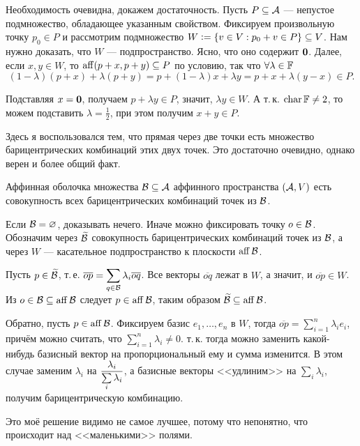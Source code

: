 \begin{solution}
    Необходимость очевидна, докажем достаточность. Пусть $P \subseteq \mathcal{A}$ --- непустое подмножество, обладающее указанным свойством. Фиксируем произвольную точку $p_0 \in P$ и рассмотрим подмножество $W \vcentcolon = \{v \in V : p_0 + v \in P\} \subseteq V$. Нам нужно доказать, что $W$ --- подпространство. Ясно, что оно содержит $\boldsymbol{0}$. Далее, если $x, y \in W$, то $\operatorname{aff}(p + x, p + y) \subseteq P$ по условию, так что $\forall \lambda \in \mathbb{F}$
    \[
        (1 - \lambda)(p + x) + \lambda(p + y) = p + (1 - \lambda)x + \lambda y = p + x + \lambda(y - x) \in P.
    \]

    Подставляя $x = \boldsymbol{0}$, получаем $p + \lambda y \in P$, значит, $\lambda y \in W$. А т.\,к. $\operatorname{char}\mathbb{F} \ne 2$, то можем подставить $\lambda = \frac{1}{2}$, при этом получим $x + y \in P$.
\end{solution}

Здесь я воспользовался тем, что прямая через две точки есть множество барицентрических комбинаций этих двух точек. Это достаточно очевидно, однако верен и более общий факт.

\begin{problem}[Из Винберга]
    Аффинная оболочка множества $\mathcal{B} \subseteq \mathcal{A}$ аффинного пространства $(\mathcal{A}, V)$ есть совокупность всех барицентрических комбинаций точек из $\mathcal{B}$.
\end{problem}

\begin{solution}
    Если $\mathcal{B} = \varnothing$, доказывать нечего. Иначе можно фиксировать точку $o \in \mathcal{B}$. Обозначим через $\widetilde{\mathcal{B}}$ совокупность барицентрических комбинаций точек из $\mathcal{B}$, а через $W$ --- касательное подпространство к плоскости $\operatorname{aff}\mathcal{B}$.

    Пусть $p \in \widetilde{\mathcal{B}}$, т.\,е. $\displaystyle\overline{op} = \sum_{q \in \mathcal{B}}\lambda_i\overline{oq}$. Все векторы $\overline{oq}$ лежат в $W$, а значит, и $\overline{op} \in W$. Из $o \in \mathcal{B} \subseteq \operatorname{aff}\mathcal{B}$ следует $p \in \operatorname{aff}\mathcal{B}$, таким образом $\widetilde{\mathcal{B}} \subseteq \operatorname{aff}\mathcal{B}$.

    Обратно, пусть $p \in \operatorname{aff}\mathcal{B}$. Фиксируем базис $e_1, \ldots, e_n$ в $W$, тогда $\overline{op} = \sum\limits_{i = 1}^n\lambda_ie_i$, причём можно считать, что $\sum\limits_{i = 1}^n\lambda_i \ne 0$. т.\,к. тогда можно заменить какой-нибудь базисный вектор на пропорциональный ему и сумма изменится. В этом случае заменим $\lambda_i$ на $\displaystyle\frac{\lambda_i}{\sum\limits_i\lambda_i}$, а базисные векторы <<удлиним>> на $\sum\limits_i\lambda_i$, получим барицентрическую комбинацию.

    Это моё решение видимо не самое лучшее, потому что непонятно, что происходит над <<маленькими>> полями.
\end{solution}

